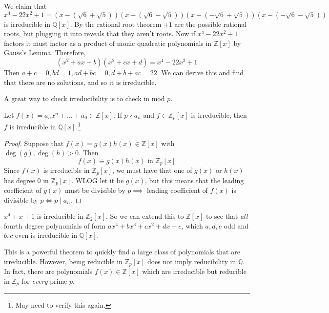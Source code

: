   \begin{example}
    We claim that $x^4 - 22x^2 + 1 = (x - (\sqrt{6} + \sqrt{5})) (x - (\sqrt{6} - \sqrt{5})) (x - (-\sqrt{6} + \sqrt{5})) (x - (-\sqrt{6} - \sqrt{5})) $ is irreducible in $\mathbb{Q} [x]$. By the rational root theorem $\pm 1$ are the possible rational roots, but plugging it into reveals that they aren't roots. Now if $x^4 - 22x^2 + 1$ factors it must factor as a product of monic quadratic polynomials in $\mathbb{Z}[x]$ by Gauss's Lemma. Therefore, 
    \begin{equation}
      (x^2 + ax + b) (x^2 + cx + d) = x^4 - 22x^2 + 1
    \end{equation}
    Then $a + c = 0, bd = 1, ad + bc = 0, d + b + ac = 22$. We can derive this and find that there are no solutions, and so it is irreducible. 
  \end{example}

  A great way to check irreducibility is to check in mod $p$. 

  \begin{theorem}
    Let $f(x) = a_n x^n + \ldots + a_0 \in \mathbb{Z}[x]$. If $p \nmid a_n$ and $f \in \mathbb{Z}_p [x]$ is irreducible, then $f$ is irreducible in $\mathbb{Q}[x]$.\footnote{May need to verify this again.}
  \end{theorem}
  \begin{proof}
    Suppose that $f(x) = g(x) h(x) \in \mathbb{Z}[x]$ with $\deg(g), \deg(h) > 0$. Then 
    \begin{equation}
      f(x) \equiv g(x) h(x) \text{ in } \mathbb{Z}_p [x]
    \end{equation}
    Since $f(x)$ is irreducible in $\mathbb{Z}_p [x]$, we must have that one of $g(x)$ or $h(x)$ has degree $0$ in $\mathbb{Z}_p [x]$. WLOG let it be $g(x)$, but this means that the leading coefficient of $g(x)$ must be divisible by $p \implies$ leading coefficient of $f(x)$ is divisible by $p \iff p \mid a_n$. 
  \end{proof}

  \begin{example}
    $x^4 + x + 1$ is irreducible in $\mathbb{Z}_2 [x]$. So we can extend this to $\mathbb{Z}[x]$ to see that \textit{all} fourth degree polynomials of form $a x^4 + b x^3 + c x^2 + dx + e$, which $a, d, e$ odd and $b, c$ even is irreducible in $\mathbb{Q}[x]$. 
  \end{example}

  This is a powerful theorem to quickly find a large class of polynomials that are irreducible. However, being reducible in $\mathbb{Z}_p [x]$ does not imply reducibility in $\mathbb{Q}$. In fact, there are polynomials $f(x) \in \mathbb{Z}[x]$ which are irreducible but reducible in $\mathbb{Z}_p$ for \textit{every} prime $p$. 

